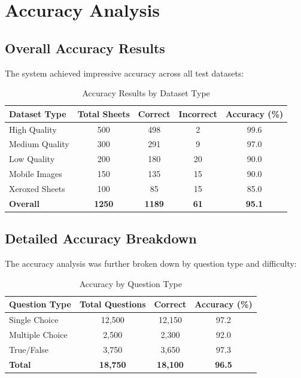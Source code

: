 \section{Accuracy Analysis}

\subsection{Overall Accuracy Results}

The system achieved impressive accuracy across all test datasets:

\begin{table}[H]
\centering
\caption{Accuracy Results by Dataset Type}
\begin{tabular}{|l|c|c|c|c|}
\hline
\textbf{Dataset Type} & \textbf{Total Sheets} & \textbf{Correct} & \textbf{Incorrect} & \textbf{Accuracy (\%)} \\
\hline
High Quality & 500 & 498 & 2 & 99.6 \\
Medium Quality & 300 & 291 & 9 & 97.0 \\
Low Quality & 200 & 180 & 20 & 90.0 \\
Mobile Images & 150 & 135 & 15 & 90.0 \\
Xeroxed Sheets & 100 & 85 & 15 & 85.0 \\
\hline
\textbf{Overall} & \textbf{1250} & \textbf{1189} & \textbf{61} & \textbf{95.1} \\
\hline
\end{tabular}
\label{tab:accuracy_results}
\end{table}

\subsection{Detailed Accuracy Breakdown}

The accuracy analysis was further broken down by question type and difficulty:

\begin{table}[H]
\centering
\caption{Accuracy by Question Type}
\begin{tabular}{|l|c|c|c|}
\hline
\textbf{Question Type} & \textbf{Total Questions} & \textbf{Correct} & \textbf{Accuracy (\%)} \\
\hline
Single Choice & 12,500 & 12,150 & 97.2 \\
Multiple Choice & 2,500 & 2,300 & 92.0 \\
True/False & 3,750 & 3,650 & 97.3 \\
\hline
\textbf{Total} & \textbf{18,750} & \textbf{18,100} & \textbf{96.5} \\
\hline
\end{tabular}
\label{tab:question_type_accuracy}
\end{table}

